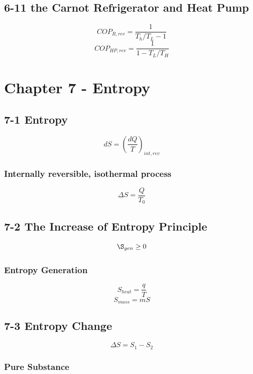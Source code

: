 \documentclass[10pt,landscape]{article}
\begin{document}
\begin{multicols}{3}
\subsection{6-11 the Carnot Refrigerator and Heat Pump}
\begin{equation}
    COP_{R,rev}=\frac{1}{T_h/T_L-1}
\end{equation}
\begin{equation}
    COP_{HP,rev}=\frac{1}{1-T_L/T_H}
\end{equation}

\section{Chapter 7 - Entropy}
\subsection{7-1 Entropy}
\begin{equation}
    dS=(\frac{dQ}{T})_{int,rev}
\end{equation}
\subsubsection{Internally reversible, isothermal process}
\begin{equation}
    \Delta S = \frac{Q}{T_0}
\end{equation}
\subsection{7-2 The Increase of Entropy Principle}
\begin{equation}
\S_{gen}\geq0    
\end{equation}
\subsubsection{Entropy Generation}
\begin{equation}
    S_{heat}=\frac{q}{T}
\end{equation}
\begin{equation}
    S_{mass}=mS
\end{equation}
\subsection{7-3 Entropy Change}
\begin{equation}
    \Delta S = S_1-S_2
\end{equation}
\subsubsection{Pure Substance}

\end{multicols}
\end{document}
